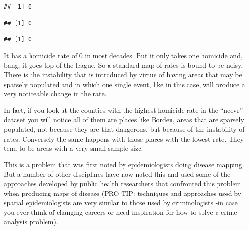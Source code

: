 \documentclass[
]{book}
\newenvironment{Shaded}{\begin{snugshade}}{\end{snugshade}}
\newcommand{\NormalTok}[1]{#1}
\newcommand{\SpecialCharTok}[1]{\textcolor[rgb]{0.00,0.00,0.00}{#1}}
\begin{document}
\begin{verbatim}
## [1] 0
\end{verbatim}

\begin{Shaded}
\end{Shaded}

\begin{verbatim}
## [1] 0
\end{verbatim}

\begin{Shaded}
\end{Shaded}

\begin{verbatim}
## [1] 0
\end{verbatim}

It has a homicide rate of 0 in most decades. But it only takes one homicide and, bang, it goes top of the league. So a standard map of rates is bound to be noisy. There is the instability that is introduced by virtue of having areas that may be sparsely populated and in which one single event, like in this case, will produce a very noticeable change in the rate.

In fact, if you look at the counties with the highest homicide rate in the ``ncovr'' dataset you will notice all of them are places like Borden, areas that are sparsely populated, not because they are that dangerous, but because of the instability of rates. Conversely the same happens with those places with the lowest rate. They tend to be areas with a very small sample size.

This is a problem that was first noted by epidemiologists doing disease mapping. But a number of other disciplines have now noted this and used some of the approaches developed by public health researchers that confronted this problem when producing maps of disease (PRO TIP: techniques and approaches used by spatial epidemiologists are very similar to those used by criminologists -in case you ever think of changing careers or need inspiration for how to solve a crime analysis problem).
\end{document}
